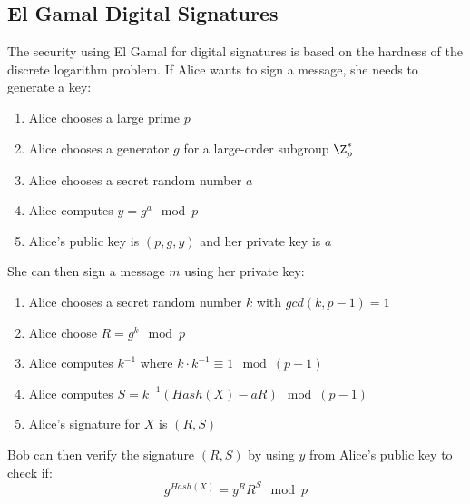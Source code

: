 \documentclass{math}
\begin{document}
\subsection*{El Gamal Digital Signatures}
The security using El Gamal for digital signatures is based on the hardness of
the discrete logarithm problem. If Alice wants to sign a message, she needs to
generate a key:
\begin{enumerate}
  \item Alice chooses a large prime \( p \)
  \item Alice chooses a generator \( g \) for a large-order subgroup
  \( \Z_p^* \)
  \item Alice chooses a secret random number \( a \)
  \item Alice computes \( y = g^a\mod p \)
  \item Alice's public key is \( (p,g,y) \) and her private key is \( a \)
\end{enumerate}
She can then sign a message \( m \) using her private key:
\begin{enumerate}
  \item Alice chooses a secret random number \( k \) with \( gcd(k,p-1) = 1 \)
  \item Alice choose \( R = g^k\mod p \)
  \item Alice computes \( k^{-1} \) where \( k\cdot k^{-1}\equiv1\mod(p-1) \)
  \item Alice computes \( S = k^{-1}(Hash(X)-aR)\mod(p-1) \)
  \item Alice's signature for \( X \) is \( (R,S) \)
\end{enumerate}
Bob can then verify the signature \( (R,S) \) by using \( y \) from Alice's
public key to check if:
\[ g^{Hash(X)} = y^RR^S\mod p \]
\end{document}
